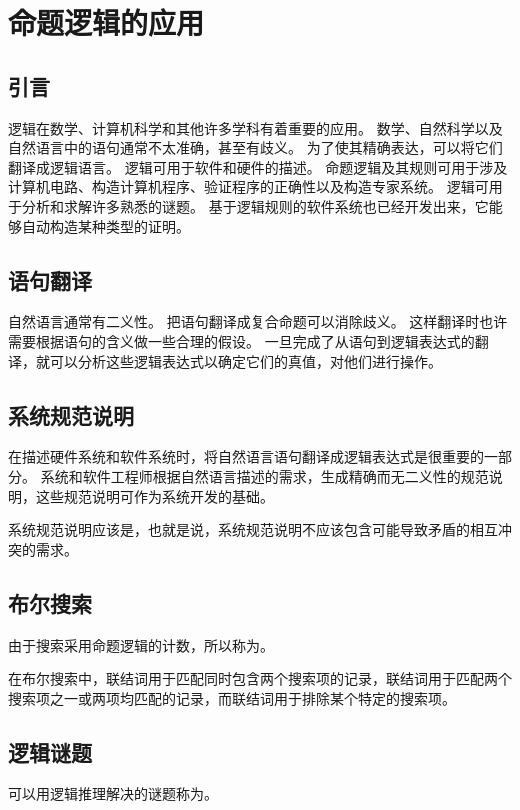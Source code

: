 
\section{命题逻辑的应用}
{
    \subsection{引言}
    {
        逻辑在数学、计算机科学和其他许多学科有着重要的应用。
        数学、自然科学以及自然语言中的语句通常不太准确，甚至有歧义。
        为了使其精确表达，可以将它们翻译成逻辑语言。
        逻辑可用于软件和硬件的描述。
        命题逻辑及其规则可用于涉及计算机电路、构造计算机程序、验证程序的正确性以及构造专家系统。
        逻辑可用于分析和求解许多熟悉的谜题。
        基于逻辑规则的软件系统也已经开发出来，它能够自动构造某种类型的证明。
    }

    \subsection{语句翻译}
    {
        自然语言通常有二义性。
        把语句翻译成复合命题可以消除歧义。
        这样翻译时也许需要根据语句的含义做一些合理的假设。
        一旦完成了从语句到逻辑表达式的翻译，就可以分析这些逻辑表达式以确定它们的真值，对他们进行操作。
    }

    \subsection{系统规范说明}
    {
        在描述硬件系统和软件系统时，将自然语言语句翻译成逻辑表达式是很重要的一部分。
        系统和软件工程师根据自然语言描述的需求，生成精确而无二义性的规范说明，这些规范说明可作为系统开发的基础。

        系统规范说明应该是，也就是说，系统规范说明不应该包含可能导致矛盾的相互冲突的需求。
    }

    \subsection{布尔搜索}
    {
        由于搜索采用命题逻辑的计数，所以称为。

        在布尔搜索中，联结词用于匹配同时包含两个搜索项的记录，联结词用于匹配两个搜索项之一或两项均匹配的记录，而联结词用于排除某个特定的搜索项。
    }

    \subsection{逻辑谜题}
    {
        可以用逻辑推理解决的谜题称为。
    }

}
